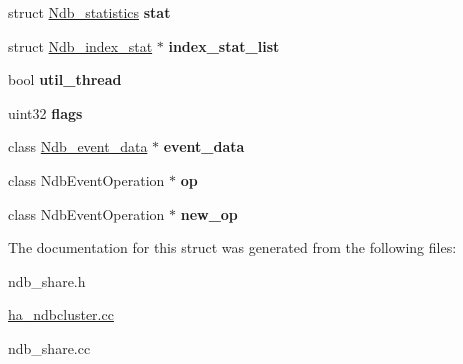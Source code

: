 \begin{DoxyCompactItemize}
struct \mbox{\hyperlink{structNdb__statistics}{Ndb\+\_\+statistics}} {\bfseries stat}
\item 
\mbox{\label{structNDB__SHARE_a89e71094a8385980428d0b5f80b7d57f}} 
struct \mbox{\hyperlink{structNdb__index__stat}{Ndb\+\_\+index\+\_\+stat}} $\ast$ {\bfseries index\+\_\+stat\+\_\+list}
\item 
\mbox{\label{structNDB__SHARE_a869d11373fbffed62dab0a60f249c90a}} 
bool {\bfseries util\+\_\+thread}
\item 
\mbox{\label{structNDB__SHARE_a74b1ba7a4b7e4f3365087bc6522083a4}} 
uint32 {\bfseries flags}
\item 
\mbox{\label{structNDB__SHARE_ab5792833c9a66c4e9eece62fbbc9e365}} 
class \mbox{\hyperlink{classNdb__event__data}{Ndb\+\_\+event\+\_\+data}} $\ast$ {\bfseries event\+\_\+data}
\item 
\mbox{\label{structNDB__SHARE_a730cfc828e96b9106cb85b471acf561d}} 
class Ndb\+Event\+Operation $\ast$ {\bfseries op}
\item 
\mbox{\label{structNDB__SHARE_aed9b6f0386d4c547862c7f7206ca79af}} 
class Ndb\+Event\+Operation $\ast$ {\bfseries new\+\_\+op}
\end{DoxyCompactItemize}


The documentation for this struct was generated from the following files\+:\begin{DoxyCompactItemize}
\item 
ndb\+\_\+share.\+h\item 
\mbox{\hyperlink{ha__ndbcluster_8cc}{ha\+\_\+ndbcluster.\+cc}}\item 
ndb\+\_\+share.\+cc\end{DoxyCompactItemize}
